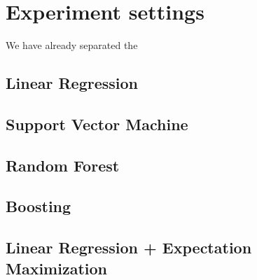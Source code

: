 \section{Experiment settings}
\label{sec:experiments}

We have already separated the 

\subsection{Linear Regression}

\subsection{Support Vector Machine}

\subsection{Random Forest}

\subsection{Boosting}

\subsection{Linear Regression + Expectation Maximization}